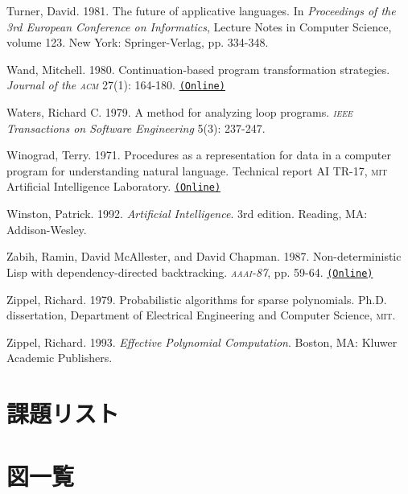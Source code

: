 \documentclass[oneside]{book}
\newcommand{\acronym}[1]{\textsc{\MakeLowercase{#1}}}
\newcommand{\code}[1]{\texttt{#1}}
\begin{document}
 \label{Turner 1981}
Turner, David.  1981.  The future of applicative languages.  In
\textit{Proceedings of the 3rd European Conference on Informatics}, Lecture Notes
in Computer Science, volume 123. New York: Springer-Verlag, pp.  334-348.

 \label{Wand 1980}
Wand, Mitchell.  1980.  Continuation-based program transformation strategies.
\textit{Journal of the \acronym{ACM}} 27(1): 164-180.
\href{http://citeseerx.ist.psu.edu/viewdoc/summary?doi=10.1.1.83.8567}{\code{(Online)}}

 \label{Waters (1979)}
Waters, Richard C.  1979.  A method for analyzing loop programs.
\textit{\acronym{IEEE} Transactions on Software Engineering} 5(3): 237-247.

Winograd, Terry.  1971.  Procedures as a representation for data in a computer
program for understanding natural language.  Technical report AI TR-17,
\acronym{MIT} Artificial Intelligence Laboratory.
\href{http://dspace.mit.edu/handle/1721.1/7095}{\code{(Online)}}

 \label{Winston 1992}
Winston, Patrick. 1992. \textit{Artificial Intelligence}.  3rd edition.  Reading,
MA: Addison-Wesley.

 \label{Zabih et al. 1987}
Zabih, Ramin, David McAllester, and David Chapman.  1987.  Non-deterministic
Lisp with dependency-directed backtracking.  \textit{\acronym{AAAI}-87},
pp. 59-64.
\href{http://www.aaai.org/Papers/AAAI/1987/AAAI87-011.pdf}{\code{(Online)}}

 \label{Zippel (1979)}
Zippel, Richard.  1979.  Probabilistic algorithms for sparse polynomials.
Ph.D. dissertation, Department of Electrical Engineering and Computer Science,
\acronym{MIT}.

 \label{Zippel 1993}
Zippel, Richard.  1993.  \textit{Effective Polynomial Computation}.  Boston, MA:
Kluwer Academic Publishers.

\chapter*{課題リスト}
\label{List of Exercises}

% 


\chapter*{図一覧}
\label{List of Figures}
\end{document}

